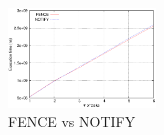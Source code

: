 \begin{figure}[t]
\begin{center}
\includegraphics[width=0.35\textwidth]{img/poll_vs_irq}
\caption{FENCE vs NOTIFY}
\end{center}
\label{fig:poll_vs_irq}
\end{figure}
\fi


